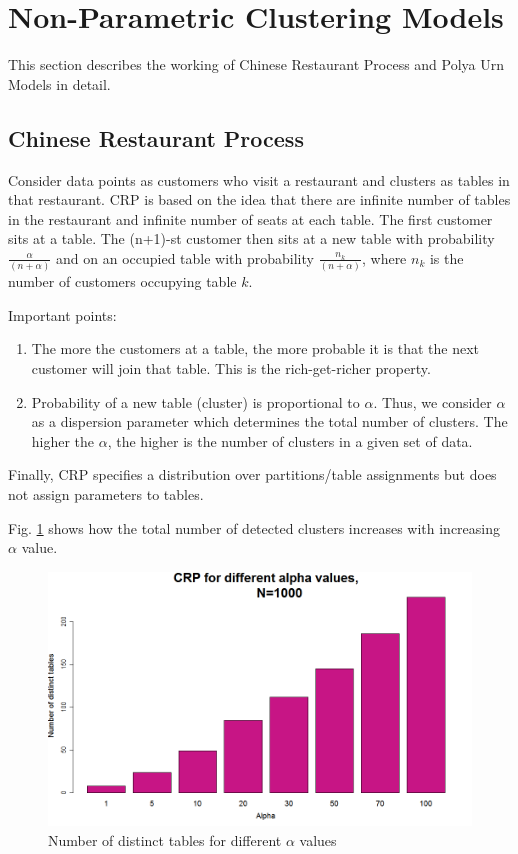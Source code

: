 \documentclass{article} %
\begin{document}
\section{Non-Parametric Clustering Models}
This section describes the working of Chinese Restaurant Process and Polya Urn Models in detail.
\subsection{Chinese Restaurant Process}
Consider data points as customers who visit a restaurant and clusters as tables in that restaurant. CRP is based on the idea that there are infinite number of tables in the restaurant and infinite number of seats at each table. The first customer sits at a table. The (n+1)-st customer then sits at a new table with probability $\frac{\alpha}{(n+\alpha)}$ and on an occupied table with probability $\frac{n_k}{(n+\alpha)}$, where $n_k$ is the number of customers occupying table $k$.

Important points:
\begin{enumerate}
\item The more the customers at a table, the more probable it is that the next customer will join that table. This is the rich-get-richer property.
\item Probability of a new table (cluster) is proportional to $\alpha$. Thus, we consider $\alpha$ as a dispersion parameter which determines the total number of clusters. The higher the $\alpha$, the higher is the number of clusters in a given set of data.
\end{enumerate}
Finally, CRP specifies a distribution over partitions/table assignments but does not assign parameters to tables.

Fig. \ref{fig:crp} shows how the total number of detected clusters increases with increasing $\alpha$ value.
\begin{figure}[h]
\begin{center}
\includegraphics[width=.5\linewidth]{plots/crp.png}
\caption{Number of distinct tables for different $\alpha$ values}
\label{fig:crp}
\end{center}
\end{figure}
\end{document}
